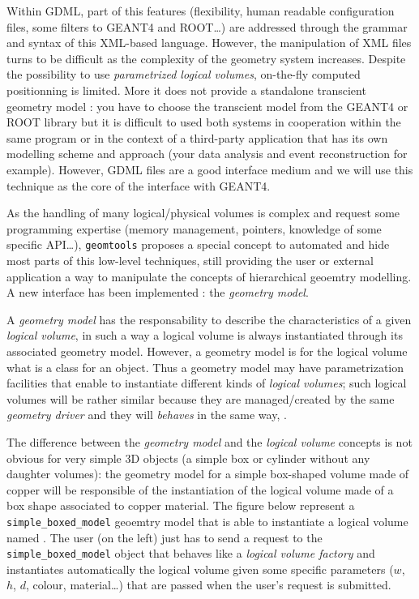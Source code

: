 Within  GDML,  part  of  this features  (flexibility,  human  readable
configuration  files,  some  filters  to  GEANT4  and  ROOT\dots)  are
addressed   through  the   grammar  and   syntax  of   this  XML-based
language. However, the manipulation of XML files turns to be difficult
as  the  complexity of  the  geometry  system  increases. Despite  the
possibility  to use  \emph{parametrized  logical volumes},  on-the-fly
computed  positionning  is  limited.   More  it  does  not  provide  a
standalone  transcient  geometry  model  :  you  have  to  choose  the
transcient model from the GEANT4  or ROOT library but it is difficult 
to used both systems in  cooperation  within  the same  program  
or  in  the context  of  a
third-party application that has its own modelling scheme and approach
(your data  analysis and event reconstruction  for example).  However,
GDML files are a  good interface medium and we will use this technique
 as the core of the interface with GEANT4.

As  the  handling of  many  logical/physical  volumes  is complex  and
request some programming expertise (memory management, pointers, knowledge
of some specific API\dots),
\texttt{geomtools} proposes a special concept to automated and hide
most parts of  this low-level techniques, still providing  the user or
external application a way  to manipulate the concepts of hierarchical
geoemtry  modelling.  A  new  interface  has been  implemented  :  the
\emph{geometry model}.

A  \emph{geometry  model}  has  the  responsability  to  describe  the
characteristics  of a  given \emph{logical  volume}, in  such a  way a
logical volume is always  instantiated through its associated geometry
model. However, a  geometry model is for the logical  volume what is a
class for  an object.  Thus  a geometry model may  have parametrization
facilities that enable to  instantiate different kinds of \emph{logical
  volumes}; such logical volumes will be rather similar because 
they are managed/created by the same \emph{geometry driver} and 
they will \emph{behaves} in the same way, .

The difference between the \emph{geometry model} and the \emph{logical
  volume} concepts is not obvious for very simple 3D objects (a simple
box or cylinder without any  daughter volumes): the geometry model for
a simple box-shaped  volume made of copper will  be responsible of the
instantiation of the logical volume  made of a box shape associated to
copper     material.     The      figure     below     represent     a
\texttt{simple\_boxed\_model}   geoemtry  model   that   is  able   to
instantiate a logical volume  named .  The user (on
the    left)    just    has    to    send    a    request    to    the
\texttt{simple\_boxed\_model} object that behaves like a \emph{logical
  volume     factory}    and     instantiates     automatically    the
  logical  volume  given some  specific  parameters
($w$, $h$, $d$, colour, material\dots) that are passed when the user's
request is submitted.


